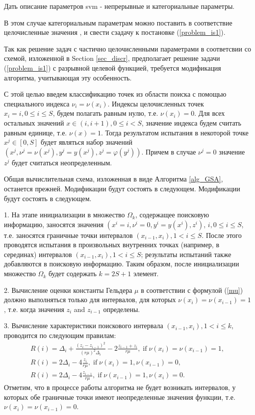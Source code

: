\documentclass[preprint,12pt]{elsarticle}
\begin{document}
Дать описание параметров svm - непрерывные и категориальные параметры.

В этом случае категориальным параметрам можно поставить в соответствие целочисленные значения , и свести сзадачу к постановке (\ref{problem_is1}).

Так как решение задач с частично целочисленными параметрами в соответсвии со схемой, изложенной в Section \ref{sec_discr}, предполагает решение задачи (\ref{problem_is1}) с разрывной целевой функцией, требуется модификация алгоритма, учитывающая эту особенность.

С этой целью введем классификацию точек из области поиска с помощью специального индекса $\nu_i=\nu(x_i)$.
Индексы целочисленных точек $x_i = i, 0\leq i \leq S$, будем полагать равным нулю, т.е. $\nu(x_i) = 0$. Для всех остальных значений $x\in(i,i+1),  0 \leq i < S$, значение индекса будем считать равным единице, т.е. $\nu(x) = 1$. Тогда результатом испытания в некоторой точке $x^j\in[0,S]$ будет являться набор значений
$(x^j, \nu^j=\nu(x^j), y^j=y(x^j), z^j = \varphi(y^j))$. Причем в случае $\nu^j=0$ значение $z^j$ будет считаться неопределенным.

Общая вычислительная схема, изложенная в виде Алгоритма \ref{alg_GSA}, останется прежней. Модификации будут состоять в следующем.
Модификации будут состоять в следующем.

1. На этапе инициализации в множество $\Omega_k$, содержащее поисковую информацию, заносятся значения $(x^i = i, \nu^i=0, y^i=y(x^i), z^i)$, $ i, 0\leq i \leq S$, т.е. заносятся граничные точки интервалов $(x_{i-1},x_i), 1<i\leq S$.
После этого проводятся испытания в произвольных внутренних точках (например, в серединах) интервалов $(x_{i-1},x_i), 1<i\leq S$; результаты испытаний также добавляются в поисковую информацию. 
Таким образом, после инициализации множество $\Omega_k$ будет содержать $k=2S+1$ элемент.

2. Вычисление оценки константы Гельдера $\mu$ в соответствии с формулой (\ref{mu}) должно выполняться только для  интервалов, для которых $\nu(x_i) = \nu(x_{i-1}) = 1$, т.е. когда значения $z_i$ and $z_{i-1}$ определены.

3. Вычисление характеристики поискового интервала $(x_{i-1},x_i), 1<i\leq k$, проводится по следующим правилам:
\begin{gather}\label{R_int}
R(i) = \Delta_i + \frac{(z_i-z_{i-1})^2}{(r\mu)^2\Delta_i}-2\frac{z_{i-1}+z_i}{r\mu}, \; \mathrm{if} \; \nu(x_i) = \nu(x_{i-1}) = 1, \nonumber \\ 
R(i) = 2\Delta_i-4\frac{z_i}{r\mu}, \; \mathrm{if} \;  \nu(x_i) = 1, \nu(x_{i-1}) = 0, \nonumber \\ 
R(i) = 2\Delta_i-4\frac{z_{i-1}}{r\mu}, \; \mathrm{if} \;  \nu(x_{i-1}) = 1, \nu(x_{i}) = 0. \nonumber
\end{gather}
Отметим, что в процессе работы алгоритма не будет возникать интервалов, у которых обе граничные точки имеют неопределенные значения функции, т.е. $\nu(x_i) = \nu(x_{i-1}) = 0$.
\end{document}

